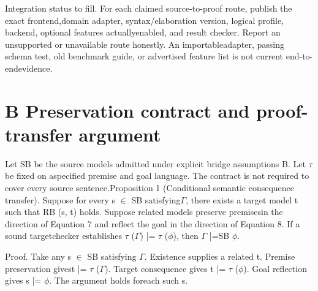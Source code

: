 
\noindent
Integration status to fill. For each claimed source-to-proof route, publish the exact frontend,\linebreak[4]
domain adapter, syntax/elaboration version, logical profile, backend, optional features actually\linebreak[4]
enabled, and result checker. Report an unsupported or unavailable route honestly. An importable\linebreak[4]
adapter, passing schema test, old benchmark guide, or advertised feature list is not current end-to-end\linebreak[4]
evidence.\par

\section*{B  Preservation contract and proof-transfer argument}
\noindent
Let SB be the source models admitted under explicit bridge assumptions B. Let \ensuremath{\tau} be fixed on a\linebreak[4]
specified premise and goal language. The contract is not required to cover every source sentence.\linebreak[4]
Proposition 1 (Conditional semantic consequence transfer). Suppose for every s \ensuremath{\in} SB satisfying\linebreak[4]
\ensuremath{\Gamma}, there exists a target model t such that RB (s, t) holds. Suppose related models preserve premises\linebreak[4]
in the direction of Equation 7 and reflect the goal in the direction of Equation 8. If a sound target\linebreak[4]
checker establishes \ensuremath{\tau} (\ensuremath{\Gamma}) |= \ensuremath{\tau} (\ensuremath{\phi}), then \ensuremath{\Gamma} |=SB \ensuremath{\phi}.\par

\noindent
Proof. Take any s \ensuremath{\in} SB satisfying \ensuremath{\Gamma}. Existence supplies a related t. Premise preservation gives\linebreak[4]
t |= \ensuremath{\tau} (\ensuremath{\Gamma}). Target consequence gives t |= \ensuremath{\tau} (\ensuremath{\phi}). Goal reflection gives s |= \ensuremath{\phi}. The argument holds for\linebreak[4]
each such s.\par

